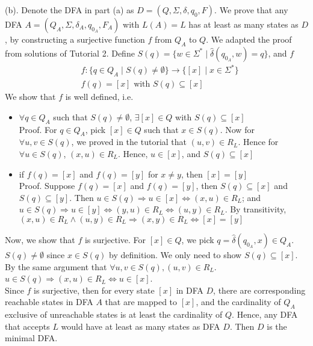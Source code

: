 \documentclass[12pt]{article}
\begin{document}
\noindent (b). Denote the DFA in part (a) as \(D = (Q, \Sigma, \delta, q_{0}, F)\). We prove that any DFA \(A = (Q_{A}, \Sigma, \delta_{A}, q_{0_{A}}, F_{A})\) with \(L(A) = L\) has at least as many states as \(D\), by constructing a surjective function \(f\) from \(Q_{A}\) to \(Q\). We adapted the proof from solutions of Tutorial 2. Define \(S(q) = \{w \in \Sigma^{*} \mid \hat{\delta}(q_{0_{A}}, w) = q\}\), and \(f\) 
\begin{align*}
  &f : \{q \in Q_{A} \mid S(q) \neq \emptyset\} \to \{[x] \mid x \in \Sigma^{*}\} \\
  &f(q) = [x] \text{ with } S(q) \subseteq [x]
\end{align*}
We show that \(f\) is well defined, i.e.
\begin{itemize}
  \item \(\forall q \in Q_{A}\) such that \(S(q) \neq \emptyset\), \(\exists [x] \in Q\) with \(S(q) \subseteq [x]\)\\
  Proof. For \(q \in Q_{A}\), pick \([x] \in Q\) such that \(x \in S(q)\). Now for \(\forall u, v \in S(q)\), we proved in the tutorial that \((u, v) \in R_{L}\). Hence for \(\forall u \in S(q)\), \((x, u) \in R_{L}\). Hence, \(u \in [x]\), and \(S(q) \subseteq [x]\)
  \item if \(f(q) = [x]\) and \(f(q) = [y]\) for \(x \neq y\), then \([x] = [y]\)\\
  Proof. Suppose \(f(q) = [x]\) and \(f(q) = [y]\), then \(S(q) \subseteq [x]\) and \(S(q) \subseteq [y]\). Then \(u \in S(q) \Rightarrow u \in [x] \Leftrightarrow (x, u) \in R_{L}\); and \(u \in S(q) \Rightarrow u \in [y] \Leftrightarrow (y, u) \in R_{L} \Leftrightarrow (u, y) \in R_{L}\). By transitivity, \((x, u) \in R_{L} \land (u, y) \in R_{L} \Rightarrow (x, y) \in R_{L} \Leftrightarrow [x] = [y]\)
\end{itemize}
Now, we show that \(f\) is surjective. For \([x] \in Q\), we pick \(q = \hat{\delta}(q_{0_{A}}, x) \in Q_{A}\). \(S(q) \neq \emptyset\) since \(x \in S(q)\) by definition. We only need to show \(S(q) \subseteq [x]\). By the same argument that \(\forall u, v \in S(q), (u, v) \in R_{L}\). \(u \in S(q) \Rightarrow (x, u) \in R_{L} \Leftrightarrow u \in [x]\).\\ 
Since \(f\) is surjective, then for every state \([x]\) in DFA \(D\), there are corresponding reachable states in DFA \(A\) that are mapped to \([x]\), and the cardinality of \(Q_{A}\) exclusive of unreachable states is at least the cardinality of \(Q\). Hence, any DFA that accepts \(L\) would have at least as many states as DFA \(D\). Then \(D\) is the minimal DFA.
\end{document}
